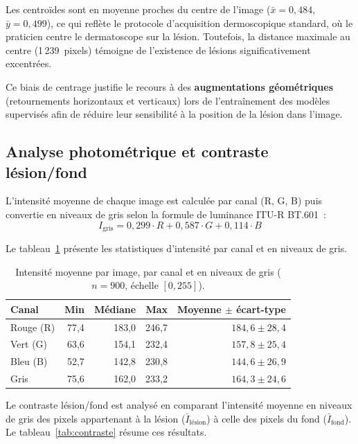 \documentclass[12pt,a4paper]{article}
\begin{document}
Les centroïdes sont en moyenne proches du centre de l'image ($\bar{x} = 0{,}484$, $\bar{y} = 0{,}499$), ce qui reflète le protocole d'acquisition dermoscopique standard, où le praticien centre le dermatoscope sur la lésion. Toutefois, la distance maximale au centre (1\,239~pixels) témoigne de l'existence de lésions significativement excentrées.

Ce biais de centrage justifie le recours à des \textbf{augmentations géométriques} (retournements horizontaux et verticaux) lors de l'entraînement des modèles supervisés afin de réduire leur sensibilité à la position de la lésion dans l'image.

\subsection{Analyse photométrique et contraste lésion/fond}
\label{subsec:photometrie}

L'intensité moyenne de chaque image est calculée par canal (R, G, B) puis convertie en niveaux de gris selon la formule de luminance ITU-R BT.601~:
\begin{equation}
    I_{\text{gris}} = 0{,}299 \cdot R + 0{,}587 \cdot G + 0{,}114 \cdot B
    \label{eq:gris}
\end{equation}

Le tableau~\ref{tab:intensite} présente les statistiques d'intensité par canal et en niveaux de gris.

\begin{table}[H]
\centering
\caption{Intensité moyenne par image, par canal et en niveaux de gris ($n = 900$, échelle $[0, 255]$).}
\label{tab:intensite}
\begin{tabular}{l r r r r}
\toprule
\textbf{Canal} & \textbf{Min} & \textbf{Médiane} & \textbf{Max} & \textbf{Moyenne $\pm$ écart-type} \\
\midrule
Rouge (R) & 77,4 & 183,0 & 246,7 & $184{,}6 \pm 28{,}4$ \\
Vert (G) & 63,6 & 154,1 & 232,4 & $157{,}8 \pm 25{,}4$ \\
Bleu (B) & 52,7 & 142,8 & 230,8 & $144{,}6 \pm 26{,}9$ \\
Gris & 75,6 & 162,0 & 233,2 & $164{,}3 \pm 24{,}6$ \\
\bottomrule
\end{tabular}
\end{table}

Le contraste lésion/fond est analysé en comparant l'intensité moyenne en niveaux de gris des pixels appartenant à la lésion ($\bar{I}_{\text{lésion}}$) à celle des pixels du fond ($\bar{I}_{\text{fond}}$). Le tableau~\ref{tab:contraste} résume ces résultats.
\end{document}
